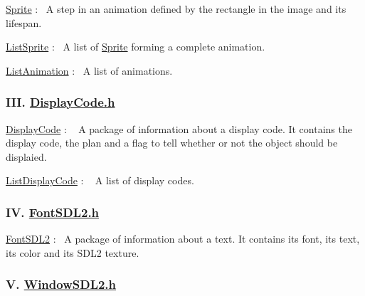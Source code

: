 \begin{DoxyEnumerate}
\item \hyperlink{structSprite}{Sprite} \+:~\newline
 A step in an animation defined by the rectangle in the image and its lifespan.
\item \hyperlink{structListSprite}{List\+Sprite} \+:~\newline
 A list of \hyperlink{structSprite}{Sprite} forming a complete animation.
\item \hyperlink{structListAnimation}{List\+Animation} \+:~\newline
 A list of animations.
\end{DoxyEnumerate}

\subsubsection*{I\+II. \hyperlink{DisplayCode_8h}{Display\+Code.\+h}}


\begin{DoxyEnumerate}
\item \hyperlink{structDisplayCode}{Display\+Code} \+: ~\newline
 A package of information about a display code. It contains the display code, the plan and a flag to tell whether or not the object should be displaied.
\item \hyperlink{structListDisplayCode}{List\+Display\+Code} \+: ~\newline
 A list of display codes.
\end{DoxyEnumerate}

\subsubsection*{IV. \hyperlink{FontSDL2_8h}{Font\+S\+D\+L2.\+h}}


\begin{DoxyEnumerate}
\item \hyperlink{structFontSDL2}{Font\+S\+D\+L2} \+:~\newline
 A package of information about a text. It contains its font, its text, its color and its S\+D\+L2 texture.
\end{DoxyEnumerate}

\subsubsection*{V. \hyperlink{WindowSDL2_8h}{Window\+S\+D\+L2.\+h}}


